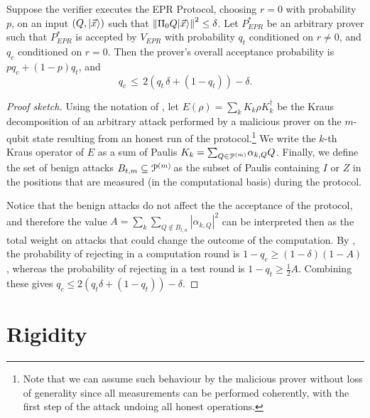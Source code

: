 \begin{theorem}[Soundness]\label{thm:EPR-soundness} 
Suppose the verifier executes the EPR Protocol, choosing $r=0$ with probability~$p$, on an input $(Q,|\vec{x}\rangle)$ such that $\left\|\Pi_0 Q|\vec{x}\rangle\right\|^2\leq \delta$. Let $P_{EPR}^*$ be an arbitrary prover such that $P_{EPR}^*$ is accepted by  $V_{EPR}$ with probability $q_t$ conditioned on $r\neq 0$, and $q_c$ conditioned on $r=0$. Then the prover's overall acceptance probability is $pq_c+(1-p)q_t$, and
$$q_c \,\leq\, 2\left(q_t\,\delta+(1-q_t)\right)-\delta.$$ 
\end{theorem}
\begin{proof}[Proof sketch]
Using the notation of \cite{broadbent15howtoverify}, let $E(\rho) = \sum_{k} K_k \rho K_k^\dagger$ be the Kraus decomposition of an arbitrary attack  performed by a malicious prover on the $m$-qubit state resulting from an honest run of the protocol.\footnote{Note that we can assume such behaviour by the malicious prover without loss of generality since  all measurements can be performed coherently, with the first step of the attack undoing all honest operations.}  We write the $k$-th Kraus operator of $E$ as a sum of Paulis $K_k = \sum_{Q\in
  \mathcal{P}^{(m)}\!} \alpha_{k,Q} Q$. Finally, we define the set of benign attacks $B_{t,m} \subseteq \mathcal{P}^{(m)}\!$ as the subset of Paulis containing $I$ or $Z$ in the positions that are measured (in the computational basis) during the protocol.
  
  Notice that the benign attacks do not affect the the acceptance of the protocol, and therefore the value 
$A=\sum_k\sum_{Q 
\not\in
  B_{t,n}}|\alpha_{k,Q}|^2$ can be interpreted then as the total weight on attacks that could change the outcome of the computation. By \cite{broadbent15howtoverify}, the probability of rejecting in a computation round is $1-q_c\geq (1-\delta)(1-A)$, whereas the probability of rejecting in a test round is $1-q_t\geq \frac{1}{2}A$. Combining these gives $q_c\leq 2(q_t\delta+(1-q_t))-\delta$.
\end{proof}







\section{Rigidity}
\label{sec:intro-rigidity}


